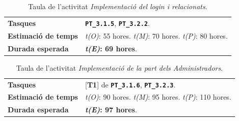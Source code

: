 \documentclass[a4paper,12pt]{ThesisStyle}
\begin{document}
\begin{table}[H]
  \begin{tabularx}{\textwidth}{l | X}
    \toprule
    \rowcolor{Blue}
    \multicolumn{2}{c}{\texttt{\textbf{A11:}} Implementació del \textit{login} i relacionats}\\
    \midrule[0.9pt]
    \textbf{Tasques}                 & \texttt{\textbf{PT\_3.1.5}}, \texttt{\textbf{PT\_3.2.2}}.\\
    \midrule
    \textbf{Estimació de temps}      & \textit{t(O)}: 55 hores.
    \newline \textit{t(M)}: 70 hores.
    \newline \textit{t(P)}: 80 hores.\\
    \midrule
    \textbf{Durada esperada}         & \textbf{\textit{t(E)}: 69 hores}.\\
    \bottomrule
  \end{tabularx}
  \caption{\label{taula:a11} Taula de l'activitat \emph{Implementació del \textit{login} i relacionats}.}
\end{table}

\begin{table}[H]
  \begin{tabularx}{\textwidth}{l | X}
    \toprule
    \rowcolor{Blue}
    \multicolumn{2}{c}{\texttt{\textbf{A12:}} Implementació de la part dels Administradors}\\
    \midrule[0.9pt]
    \textbf{Tasques}                 & [\textbf{T1}] de \texttt{\textbf{PT\_3.1.6}}, \texttt{\textbf{PT\_3.2.3}}.\\
    \midrule
    \textbf{Estimació de temps}      & \textit{t(O)}: 90 hores.
    \newline \textit{t(M)}: 95 hores.
    \newline \textit{t(P)}: 110 hores.\\
    \midrule
    \textbf{Durada esperada}         & \textbf{\textit{t(E)}: 97 hores}.\\
    \bottomrule
  \end{tabularx}
  \caption{\label{taula:a12} Taula de l'activitat \emph{Implementació de la part dels Administradors}.}
\end{table}
\end{document}
